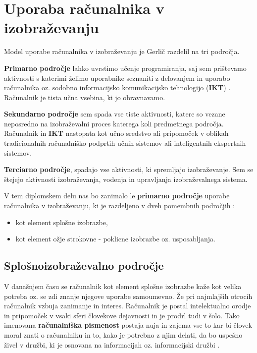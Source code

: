 
\section{Uporaba računalnika v izobraževanju}
\label{sec:uporaba-raunalnika-v}

Model uporabe računalnika v izobraževanju je Gerlič \cite{gerlic_2000}
razdelil na tri področja.

\textbf{Primarno področje} lahko uvrstimo učenje programiranja, saj
sem prištevamo aktivnosti s katerimi želimo uporabnike seznaniti z
delovanjem in uporabo računalnika oz. sodobno informacijsko
komunikacijsko tehnologijo (\textbf{IKT})
\cite{model_uporabe_rac_izo-web}. Računalnik je tista učna vsebina, ki
jo obravnavamo.

\textbf{Sekundarno področje} sem spada vse tiste aktivnosti, katere so
vezane neposredno na izobraževalni proces katerega koli predmetnega
področja. Računalnik in \textbf{IKT} nastopata kot učno sredstvo ali
pripomoček v oblikah tradicionalnih računalniško podprtih učnih
sistemov ali inteligentnih ekspertnih sistemov.

\textbf{Terciarno področje}, spadajo vse aktivnosti, ki spremljajo
izobraževanje. Sem se štejejo aktivnosti izobraževanja, vodenja  in
upravljanja izobraževalnega sistema.

V tem diplomskem delu nas bo zanimalo le \textbf{primarno področje}
uporabe računalnika v izobraževanju, ki je razdeljeno v dveh pomembnih
področjih \cite{gerlic_2000}:

\begin{itemize}
\tightlist
\item kot element splošne izobrazbe,
\item kot element ožje strokovne - poklicne izobrazbe
  oz. usposabljanja.
\end{itemize}

\subsection{Splošnoizobraževalno področje}
\label{sec:spološnoiz_področje}

V današnjem času se računalnik kot element splošne izobrazbe kaže kot
velika potreba oz. se zdi znanje njegove uporabe samoumevno. Že pri
najmlajših otrocih računalnik vzbuja zanimanje in interes.  Računalnik
je postal intelektualno orodje in pripomoček v vsaki sferi človekove
dejavnosti in je prodrl tudi v šolo. Tako imenovana \textbf{računalniška
  pismenost} postaja nuja in zajema vse to kar bi človek moral znati o
računalniku in to, kako je potrebno z njim delati, da bo uspešno živel
v družbi, ki je osnovana na informacijah oz. informacijski družbi
\cite{klemencic_2011}.


